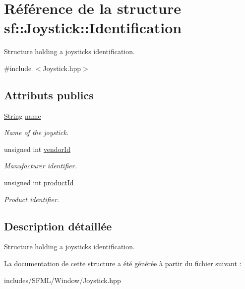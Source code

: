 \hypertarget{structsf_1_1Joystick_1_1Identification}{}\section{Référence de la structure sf\+:\+:Joystick\+:\+:Identification}
\label{structsf_1_1Joystick_1_1Identification}


Structure holding a joystick\textquotesingle{}s identification.  




{\ttfamily \#include $<$Joystick.\+hpp$>$}

\subsection*{Attributs publics}
\begin{DoxyCompactItemize}
\item 
\mbox{\label{structsf_1_1Joystick_1_1Identification_a135a9a3a4dc11c2b5cde51159b4d136d}} 
\hyperlink{classsf_1_1String}{String} \hyperlink{structsf_1_1Joystick_1_1Identification_a135a9a3a4dc11c2b5cde51159b4d136d}{name}
\begin{DoxyCompactList}\small\item\em Name of the joystick. \end{DoxyCompactList}\item 
\mbox{\label{structsf_1_1Joystick_1_1Identification_a827caf37a56492e3430e5ca6b15b5e9f}} 
unsigned int \hyperlink{structsf_1_1Joystick_1_1Identification_a827caf37a56492e3430e5ca6b15b5e9f}{vendor\+Id}
\begin{DoxyCompactList}\small\item\em Manufacturer identifier. \end{DoxyCompactList}\item 
\mbox{\label{structsf_1_1Joystick_1_1Identification_a18c21317789f51f9a5f132677727ff77}} 
unsigned int \hyperlink{structsf_1_1Joystick_1_1Identification_a18c21317789f51f9a5f132677727ff77}{product\+Id}
\begin{DoxyCompactList}\small\item\em Product identifier. \end{DoxyCompactList}\end{DoxyCompactItemize}


\subsection{Description détaillée}
Structure holding a joystick\textquotesingle{}s identification. 

La documentation de cette structure a été générée à partir du fichier suivant \+:\begin{DoxyCompactItemize}
\item 
includes/\+S\+F\+M\+L/\+Window/Joystick.\+hpp\end{DoxyCompactItemize}
